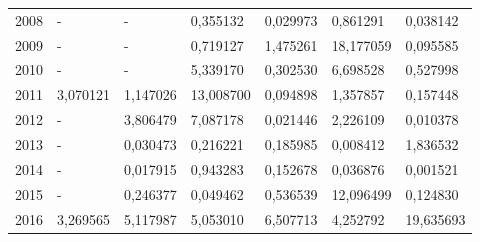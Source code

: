 \begin{table}
\begin{tabular}{p{1cm}p{2cm}p{2cm}p{2cm}p{2cm}p{2cm}p{2cm}}
 2008 &                        - &                                - &                                 0,355132 &                               0,029973 &                                     0,861291 &                                     0,038142 \\
 2009 &                        - &                                - &                                 0,719127 &                               1,475261 &                                    18,177059 &                                     0,095585 \\
 2010 &                        - &                                - &                                 5,339170 &                               0,302530 &                                     6,698528 &                                     0,527998 \\
 2011 &                 3,070121 &                         1,147026 &                                13,008700 &                               0,094898 &                                     1,357857 &                                     0,157448 \\
 2012 &                        - &                         3,806479 &                                 7,087178 &                               0,021446 &                                     2,226109 &                                     0,010378 \\
 2013 &                        - &                         0,030473 &                                 0,216221 &                               0,185985 &                                     0,008412 &                                     1,836532 \\
 2014 &                        - &                         0,017915 &                                 0,943283 &                               0,152678 &                                     0,036876 &                                     0,001521 \\
 2015 &                        - &                         0,246377 &                                 0,049462 &                               0,536539 &                                    12,096499 &                                     0,124830 \\
 2016 &                 3,269565 &                         5,117987 &                                 5,053010 &                               6,507713 &                                     4,252792 &                                    19,635693 \\
\bottomrule
\end{tabular}
\end{table}
